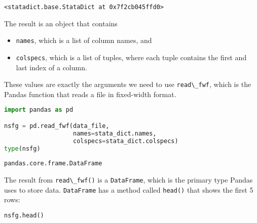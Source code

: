 \begin{lstlisting}[style=output]
<statadict.base.StataDict at 0x7f2cb045ffd0>
\end{lstlisting}

The result is an object that contains

\begin{itemize}
\item
  \passthrough{\lstinline!names!}, which is a list of column names, and
\item
  \passthrough{\lstinline!colspecs!}, which is a list of tuples, where
  each tuple contains the first and last index of a column.
\end{itemize}

These values are exactly the arguments we need to use
\passthrough{\lstinline!read\_fwf!}, which is the Pandas function that
reads a file in fixed-width format.

\begin{lstlisting}[language=Python,style=source]
import pandas as pd

nsfg = pd.read_fwf(data_file, 
                   names=stata_dict.names, 
                   colspecs=stata_dict.colspecs)
type(nsfg)
\end{lstlisting}

\begin{lstlisting}[style=output]
pandas.core.frame.DataFrame
\end{lstlisting}

The result from \passthrough{\lstinline!read\_fwf()!} is a
\passthrough{\lstinline!DataFrame!}, which is the primary type Pandas
uses to store data. \passthrough{\lstinline!DataFrame!} has a method
called \passthrough{\lstinline!head()!} that shows the first 5 rows:

\begin{lstlisting}[language=Python,style=source]
nsfg.head()
\end{lstlisting}

